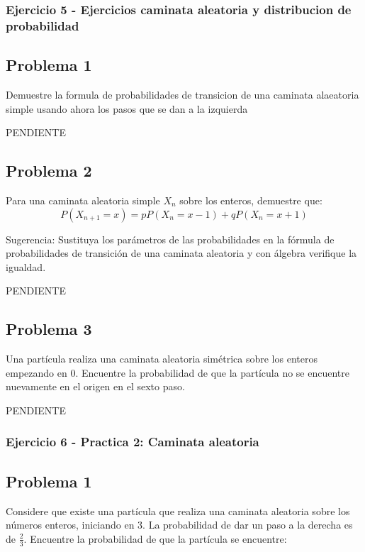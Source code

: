 \documentclass{article}
\begin{document}
\newpage

\subsubsection{Ejercicio 5 - Ejercicios caminata aleatoria y distribucion de probabilidad}

\subsection*{Problema 1}

Demuestre la formula de probabilidades de transicion de una caminata alaeatoria simple usando ahora los pasos que se dan a la izquierda

PENDIENTE

\subsection*{Problema 2}

Para una caminata aleatoria simple \(X_n\) sobre los enteros, demuestre que:
\[ P(X_{n+1} = x) = pP(X_n = x - 1) + qP(X_n = x + 1) \]

Sugerencia: Sustituya los parámetros de las probabilidades en la fórmula de probabilidades de transición de una caminata aleatoria y con álgebra verifique la igualdad.

PENDIENTE

\subsection*{Problema 3}

Una partícula realiza una caminata aleatoria simétrica sobre los enteros empezando en 0. Encuentre la probabilidad de que la partícula no se encuentre nuevamente en el origen en el sexto paso.

PENDIENTE

\subsubsection{Ejercicio 6 - Practica 2: Caminata aleatoria}

\subsection*{Problema 1}

Considere que existe una partícula que realiza una caminata aleatoria sobre los números enteros, iniciando en 3. La probabilidad de dar un paso a la derecha es de \( \frac{2}{3} \). Encuentre la probabilidad de que la partícula se encuentre:
\end{document}
